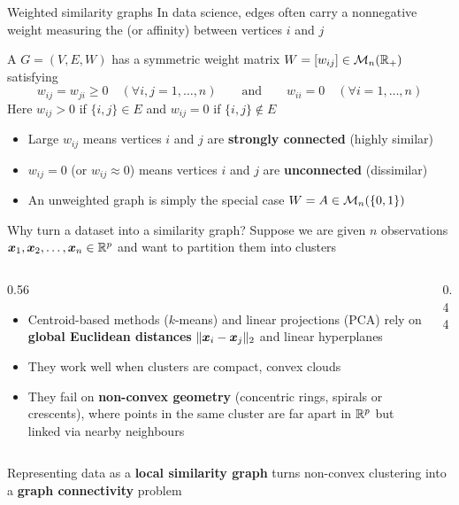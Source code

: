 \documentclass[aspectratio=169]{beamer}\usepackage[]{graphicx}\usepackage[]{xcolor}
\begin{document}
\begin{frame}{Weighted similarity graphs}
In data science, edges often carry a nonnegative weight measuring the  (or affinity) between vertices $i$ and $j$
\vfill
\begin{importantdefinition}
A  $G = (V, E, W)$ has a symmetric weight matrix $W = [w_{ij}] \in \mathcal{M}_n(\mathbb{R}_+)$ satisfying
\[
w_{ij} = w_{ji} \ge 0 \quad (\forall i, j = 1, \ldots, n) \qquad \text{and} \qquad w_{ii} = 0 \quad (\forall i = 1, \ldots, n)
\]
Here $w_{ij} > 0$ if $\{i, j\} \in E$ and $w_{ij} = 0$ if $\{i, j\} \notin E$
\end{importantdefinition}
\vfill
\begin{itemize}
\item Large $w_{ij}$ means vertices $i$ and $j$ are \textbf{strongly connected} (highly similar)
\item $w_{ij} = 0$ (or $w_{ij} \approx 0$) means vertices $i$ and $j$ are \textbf{unconnected} (dissimilar)
\item An unweighted graph is simply the special case $W = A \in \mathcal{M}_n(\{0, 1\})$
\end{itemize}
\end{frame}


\begin{frame}{Why turn a dataset into a similarity graph?}
Suppose we are given $n$ observations $\bm{x}_1, \bm{x}_2, \ldots, \bm{x}_n \in \mathbb{R}^p$ and want to partition them into clusters
\vfill
\begin{columns}[c]
\begin{column}{0.56\textwidth}
\begin{itemize}
\item Centroid-based methods ($k$-means) and linear projections (PCA) rely on \textbf{global Euclidean distances} $\|\bm{x}_i - \bm{x}_j\|_2$ and linear hyperplanes
\vfill
\item They work well when clusters are compact, convex clouds
\vfill
\item They fail on \textbf{non-convex geometry} (concentric rings, spirals or crescents), where points in the same cluster are far apart in $\mathbb{R}^p$ but linked via nearby neighbours
\end{itemize}
\end{column}
\begin{column}{0.44\textwidth}
\centering
{}
\end{column}
\end{columns}
\vfill
Representing data as a \textbf{local similarity graph} turns non-convex clustering into a \textbf{graph connectivity} problem
\end{frame}
\end{document}
